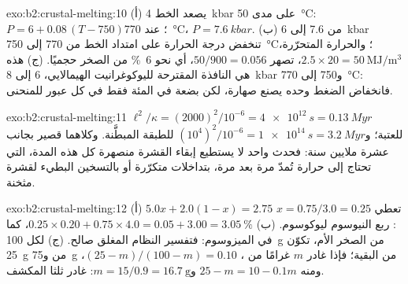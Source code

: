 \begin{solution}{exo:b2:crustal-melting:10}
(أ) يصعد الخط \qty{4}{kbar} على مدى \qty{50}{\celsius}: $P = 6 + 0.08\,(T - 750)$؛
عند \qty{770}{\celsius}، $P = \qty{7.6}{kbar}$. (ب) من 7.6 إلى \qty{6}{kbar} تنخفض
درجة الحرارة على امتداد الخط من 770 إلى \qty{750}{\celsius}؛ والحرارة المتحرّرة،
$2.5\times20 = \qty{50}{\mega\joule\per\cubic\metre}$، تصهر $50/900 = 0.056$، أي نحو
\qty{6}{\percent} من الصخر حجميًا. (ج) هذه هي النافذة المقترحة
لليوكوغرانيت الهيمالايي، 6 إلى \qty{8}{kbar} و750 إلى \qty{770}{\celsius}: فانخفاض الضغط
وحده يصنع صهارة، لكن بضعة في المئة فقط في كل عبور للمنحنى.
\end{solution}

\begin{solution}{exo:b2:crustal-melting:11}
$\ell^2/\kappa = (2000)^2/10^{-6} = \qty{4e12}{s} = \qty{0.13}{Myr}$ للعتبة؛
و$(10^4)^2/10^{-6} = \qty{1e14}{s} = \qty{3.2}{Myr}$ للطبقة المبطَّنة. وكلاهما قصير
بجانب عشرة ملايين سنة: فحدث واحد لا يستطيع إبقاء القشرة منصهرة كل هذه المدة، التي تحتاج إلى
حرارة تُمدّ مرة بعد مرة، بتداخلات متكرّرة أو بالتسخين البطيء لقشرة
مثخنة.
\end{solution}

\begin{solution}{exo:b2:crustal-melting:12}
(أ) $5.0x + 2.0(1 - x) = 2.75$ تعطي $x = 0.75/3.0 = 0.25$: ربع النيوسوم
ليوكوسوم. (ب) $0.25\times0.20 + 0.75\times4.0 = 0.05 + 3.00 = \qty{3.05}{\percent}$، كما
في الميزوسوم: فتفسير النظام المغلق صالح. (ج) لكل \qty{100}{\gram} من
الصخر الأم، تكوّن \qty{25}{\gram} من  و\qty{75}{\gram} من البقية؛ فإذا غادر $m$ غرامًا من
، $(25 - m)/(100 - m) = 0.10$، ومنه $25 - m = 10 - 0.1m$ و$m = 15/0.9 =
\qty{16.7}{\gram}$: غادر ثلثا  المكشف.
\end{solution}

